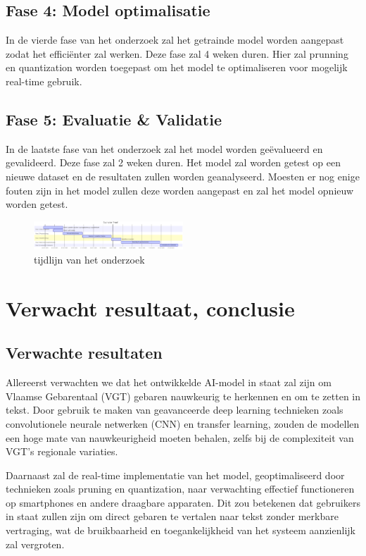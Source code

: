 \subsection{Fase 4: Model optimalisatie}
In de vierde fase van het onderzoek zal het getrainde model worden aangepast zodat het effici{\"e}nter zal werken.
Deze fase zal 4 weken duren.
Hier zal prunning en quantization worden toegepast om het model te optimaliseren voor mogelijk real-time gebruik.
\subsection{Fase 5: Evaluatie \& Validatie}
In de laatste fase van het onderzoek zal het model worden geëvalueerd en gevalideerd.
Deze fase zal 2 weken duren.
Het model zal worden getest op een nieuwe dataset en de resultaten zullen worden geanalyseerd.
Moesten er nog enige fouten zijn in het model zullen deze worden aangepast en zal het model opnieuw worden getest.

\begin{figure}[h!]
  \includegraphics[width=0.5\textwidth]{../graphics/gantt_tijd.png}
  \caption{tijdlijn van het onderzoek}
  \label{fig:gantt_tijd}
\end{figure}

\section{Verwacht resultaat, conclusie}%
\label{sec:verwachte_resultaten}
\subsection{Verwachte resultaten} Allereerst verwachten we dat het ontwikkelde AI-model in staat zal zijn om Vlaamse Gebarentaal (VGT) gebaren nauwkeurig te herkennen en om te zetten in tekst. Door gebruik te maken van geavanceerde deep learning technieken zoals convolutionele neurale netwerken (CNN) en transfer learning, zouden de modellen een hoge mate van nauwkeurigheid moeten behalen, zelfs bij de complexiteit van VGT's regionale variaties.

Daarnaast zal de real-time implementatie van het model, geoptimaliseerd door technieken zoals pruning en quantization, naar verwachting effectief functioneren op smartphones en andere draagbare apparaten. Dit zou betekenen dat gebruikers in staat zullen zijn om direct gebaren te vertalen naar tekst zonder merkbare vertraging, wat de bruikbaarheid en toegankelijkheid van het systeem aanzienlijk zal vergroten.

